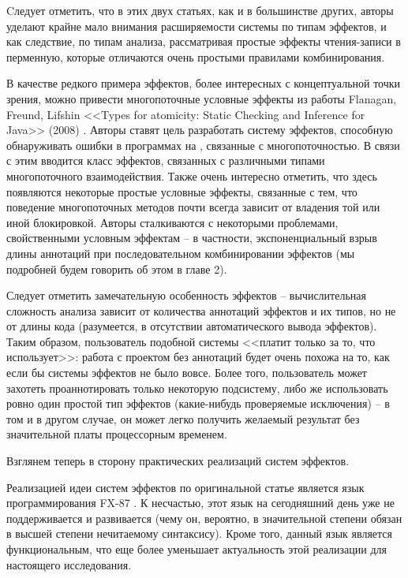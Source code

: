 Cледует отметить, что в этих двух статьях, как и в большинстве других, авторы уделают крайне мало внимания расширяемости системы по типам эффектов, и как следствие, по типам анализа, рассматривая простые  эффекты чтения-записи в перменную, которые отличаются очень простыми правилами комбинирования. 

В качестве редкого примера эффектов, более интересных с концептуальной точки зрения, можно привести многопоточные условные эффекты из работы Flanagan, Freund, Lifshin <<Types for atomicity: Static Checking and Inference for Java>> (2008) \cite{Flanagan08}. Авторы ставят цель разработать систему эффектов, способную обнаруживать ошибки в программах на , связанные с многопоточностью. В связи с этим вводится класс эффектов, связанных с различными типами многопоточного взаимодействия. Также очень интересно отметить, что здесь появляются некоторые простые условные эффекты, связанные с тем, что поведение многопоточных методов почти всегда зависит от владения той или иной блокировкой. Авторы сталкиваются с некоторыми проблемами, свойственными условным эффектам -- в частности, экспоненциальный взрыв длины аннотаций при последовательном комбинировании эффектов (мы подробней будем говорить об этом в главе 2). 

Следует отметить замечательную особенность эффектов -- вычислительная сложность анализа зависит от количества аннотаций эффектов и их типов, но не от длины кода (разумеется, в отсутствии автоматического вывода эффектов). Таким образом, пользователь подобной системы <<платит только за то, что использует>>: работа с проектом без аннотаций будет очень похожа на то, как если бы системы эффектов не было вовсе. Более того, пользователь может захотеть проаннотировать только некоторую подсистему, либо же использовать ровно один простой тип эффектов (какие-нибудь проверяемые исключения) -- в том и в другом случае, он может легко получить желаемый результат без значительной платы процессорным временем. 


\bigskip

Взглянем теперь в сторону практических реализаций систем эффектов.

Реализацией идеи систем эффектов по оригинальной статье является язык программирования FX-87 \cite{FX87}. К несчастью, этот язык на сегодняшний день уже не поддерживается и развивается (чему он, вероятно, в значительной степени обязан в высшей степени нечитаемому синтаксису). Кроме того, данный язык является функциональным, что еще более уменьшает актуальность этой реализации для настоящего исследования.


